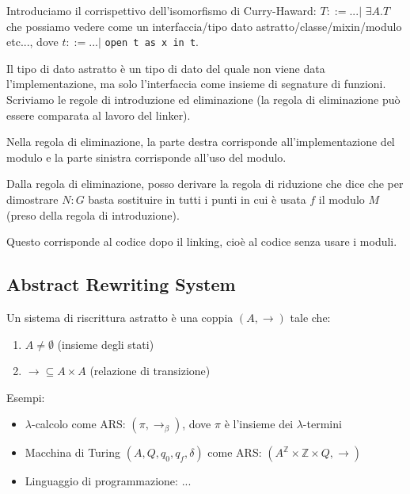 \documentclass{article}
\begin{document}
\bigskip

Introduciamo il corrispettivo dell'isomorfismo di Curry-Haward: $T::= ... |\,\,\exists A.T$ che possiamo vedere come un interfaccia/tipo dato astratto/classe/mixin/modulo etc..., dove $t::= ...|$ \verb|open t as x in t|.

\bigskip

Il tipo di dato astratto è un tipo di dato del quale non viene data l'implementazione, ma solo l'interfaccia come insieme di segnature di funzioni. Scriviamo le regole di introduzione ed eliminazione (la regola di eliminazione può essere comparata al lavoro del linker).

\bigskip


\begin{minipage}{0.49\textwidth}
\end{minipage}
{
\hspace{2em}
\begin{minipage}{0.49\textwidth}
\end{minipage}}

\bigskip

Nella regola di eliminazione, la parte destra corrisponde all'implementazione del modulo e la parte sinistra corrisponde all'uso del modulo.

\bigskip

Dalla regola di eliminazione, posso derivare la regola di riduzione che dice che per dimostrare $N:G$ basta sostituire in tutti i punti in cui è usata $f$ il modulo $M$ (preso della regola di introduzione).

\bigskip


\bigskip

Questo corrisponde al codice dopo il linking, cioè al codice senza usare i moduli.

\subsection{Abstract Rewriting System}
Un sistema di riscrittura astratto è una coppia $(A,\to)$ tale che:
\begin{enumerate}
    \item $A\not=\emptyset$ (insieme degli stati)
    \item $\to\subseteq A\times A$ (relazione di transizione)
\end{enumerate}
Esempi:
\begin{itemize}
    \item $\lambda$-calcolo come ARS: $(\pi,\to_\beta)$, dove $\pi$ è l'insieme dei $\lambda$-termini
    \item Macchina di Turing $(A,Q,q_0,q_f,\delta)$ come ARS: $(A^{\mathbb{Z}}\times\mathbb{Z}\times Q,\to)$
    \item Linguaggio di programmazione: ...
\end{itemize}
\end{document}
